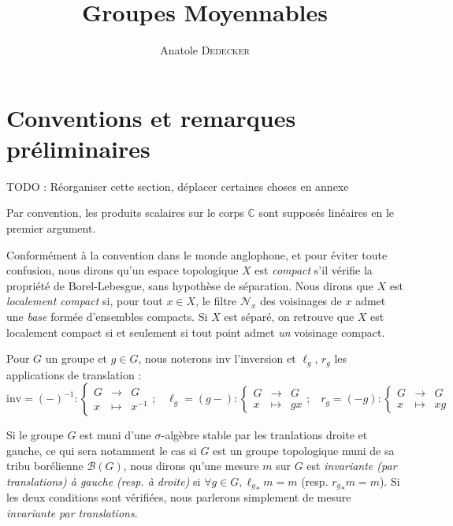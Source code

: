 \documentclass[a4paper,12pt]{article}
\newcommand{\C}{\mathbb{C}}
\newcommand{\Bor}{\mathcal{B}}
\newcommand\fundef[3]{#1: \left\{\begin{array}{ccc}#2\\#3\end{array}\right.}
\newcommand{\ssi}{si et seulement si }
\newcommand{\inv}{^{-1}}
\newcommand{\nhds}{\mathcal{N}}
\newcommand{\blank}{{-}}
\newcommand{\invop}{\mathrm{inv}}
\newcommand{\TODO}[1]{{\color{red}TODO :} #1}
\begin{document}
\begin{titlepage}
\title{Groupes Moyennables}
\author{Anatole \textsc{Dedecker}}
\maketitle
\thispagestyle{empty}
\end{titlepage}

\tableofcontents
\thispagestyle{empty}

\clearpage


\section*{Conventions et remarques préliminaires}

\TODO{Réorganiser cette section, déplacer certaines choses en annexe}

Par convention, les produits scalaires sur le corps $\C$ sont supposés linéaires en le premier argument.

Conformément à la convention dans le monde anglophone, et pour éviter toute confusion, nous dirons qu'un espace topologique
$X$ est \emph{compact} s'il vérifie la propriété de Borel-Lebesgue, sans hypothèse de séparation. 
Nous dirons que $X$ est \emph{localement compact} si, pour tout $x\in X$, le filtre $\nhds_x$ des voisinages de $x$ admet
une \emph{base} formée d'ensembles compacts. Si $X$ est séparé, on retrouve que $X$ est localement compact 
\ssi tout point admet \emph{un} voisinage compact. 

Pour $G$ un groupe et $g\in G$, nous noterons $\invop$ l'inversion et $\ell_g$, $r_g$ les applications de translation :
\begin{equation*}
    \fundef{\invop = (\blank)\inv}{G&\to& G}{x&\mapsto& x\inv}\text{;}\quad\fundef{\ell_g=(g\blank)}{G&\to& G}{x&\mapsto& gx}\text{;}\quad\fundef{r_g=(\blank g)}{G&\to& G}{x&\mapsto& xg}
\end{equation*}

Si le groupe $G$ est muni d'une $\sigma$-algèbre stable par les tranlations droite et gauche, ce qui sera notamment le cas
si $G$ est un groupe topologique muni de sa tribu borélienne $\Bor(G)$, nous dirons qu'une mesure $m$ sur $G$ est \textit{invariante
(par translations) à gauche (resp. à droite)} si $\forall g\in G, {\ell_g}_*m = m$ (resp. ${r_g}_*m = m$). Si les deux conditions
sont vérifiées, nous parlerons simplement de mesure \textit{invariante par translations}.
\end{document}
